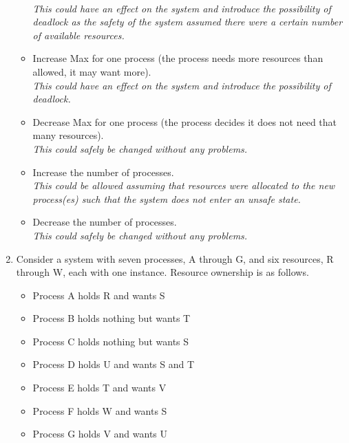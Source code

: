 \documentclass{article}
\newcommand{\answercolor}{Bittersweet}
\newcommand{\answer}[1]{{\\\color{\answercolor}\footnotesize\itshape{#1}}}
\begin{document}
\begin{enumerate}
\begin{itemize}
			\answer{This could have an effect on the system and introduce the possibility of deadlock as the safety of the system assumed there were a certain number of available resources.}
			\item Increase Max for one process (the process needs more resources than allowed, it may want more).
			\answer{This could have an effect on the system and introduce the possibility of deadlock.}
			\item Decrease Max for one process (the process decides it does not need that many resources).
			\answer{This could safely be changed without any problems.}
			\item Increase the number of processes.
			\answer{This could be allowed assuming that resources were allocated to the new process(es) such that the system does not enter an unsafe state.}
			\item Decrease the number of processes.
			\answer{This could safely be changed without any problems.}
		\end{itemize}
		\item Consider a system with seven processes, A through G, and six resources, R through W, each with one instance. Resource ownership is as follows.
		\begin{itemize}
			\item Process A holds R and wants S
			\item Process B holds nothing but wants T
			\item Process C holds nothing but wants S
			\item Process D holds U and wants S and T
			\item Process E holds T and wants V
			\item Process F holds W and wants S
			\item Process G holds V and wants U
		\end{itemize}


\end{enumerate}
\end{document}
